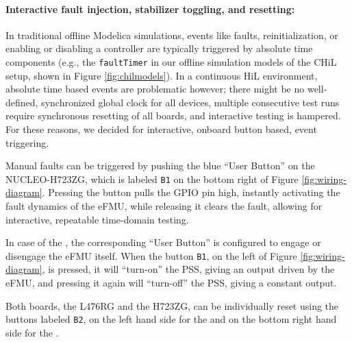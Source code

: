 \paragraph{Interactive fault injection, stabilizer toggling, and resetting:} In traditional offline Modelica simulations, events like faults, reinitialization, or enabling or disabling a controller are typically triggered by absolute time components (e.g., the \texttt{faultTimer} in our offline simulation models of the CHiL setup, shown in Figure \ref{fig:chilmodels}). In a continuous HiL environment, absolute time based events are problematic however; there might be no well-defined, synchronized global clock for all devices, multiple consecutive test runs require synchronous resetting of all boards, and interactive testing is hampered. For these reasons, we decided for interactive, onboard button based, event triggering.

Manual \plant{} faults can be triggered by pushing the blue ``User Button'' on the NUCLEO-H723ZG, which is labeled \texttt{B1} on the bottom right of Figure \ref{fig:wiring-diagram}. Pressing the button pulls the GPIO pin high, instantly activating the fault dynamics of the \plant{} eFMU, while releasing it clears the fault, allowing for interactive, repeatable time-domain testing.

In case of the \controller{}, the corresponding ``User Button'' is configured to engage or disengage the eFMU itself. When the \controller{} button \texttt{B1}, on the left of Figure \ref{fig:wiring-diagram}, is pressed, it will ``turn-on'' the PSS, giving an output driven by the eFMU, and pressing it again will ``turn-off'' the PSS, giving a constant output.

Both boards, the L476RG and the H723ZG, can be individually reset using the buttons labeled \texttt{B2}, on the left hand side for the \controller{} and on the bottom right hand side for the \plant{}.

